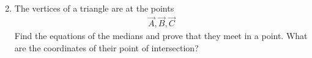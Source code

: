 \begin{enumerate}[label=\arabic*.,ref=\thesubsection.\theenumi]
\begin{align}
\end{align}
\renewcommand{\theequation}{\theenumi}
%
\item The vertices of a triangle are at the points
\begin{align}
\vec{A},
\vec{B},
\vec{C}
\end{align}
Find the equations of the medians and prove that they meet in a point.  What are the coordinates of their point of intersection?

\end{enumerate}
